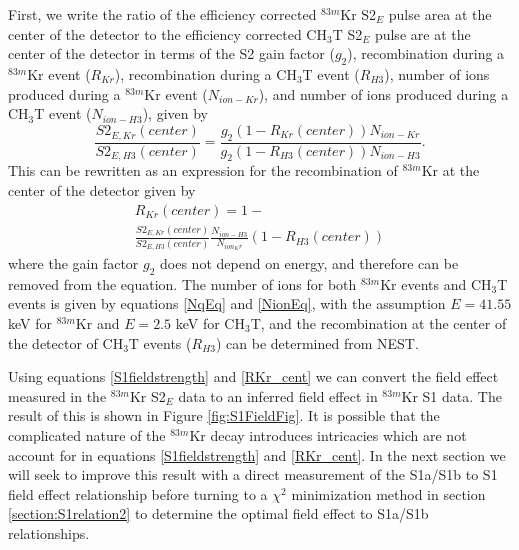 \documentclass[a4paper,10pt,twocolumn]{article}
\begin{document}
First, we write the ratio of the efficiency corrected $^{83m}$Kr  S2$_E$ pulse area at the center of the detector to the efficiency corrected CH$_3$T S2$_E$ pulse are at the center of the detector in terms of the S2 gain factor ($g_2$), recombination during a $^{83m}$Kr event ($R_{Kr}$), recombination during a CH$_3$T event ($R_{H3}$), number of ions produced during a $^{83m}$Kr event ($N_{ion-Kr}$), and number of ions produced during a CH$_3$T event ($N_{ion-H3}$), given by
\begin{equation}
\frac{S2_{E,Kr}(center)}{S2_{E,H3}(center)} = \frac{g_2(1-R_{Kr}(center))N_{ion-Kr}}{g_2(1-R_{H3}(center))N_{ion-H3}}.
\end{equation}
This can be rewritten as an expression for the recombination of $^{83m}$Kr at the center of the detector given by
\begin{multline} \label{RKr_cent}
R_{Kr}(center)=1- \\ \frac{S2_{E,Kr}(center)}{S2_{E,H3}(center)}\frac{N_{ion-H3}}{N_{ion_Kr}}(1-R_{H3}(center))
\end{multline}
where the gain factor $g_2$ does not depend on energy, and therefore can be removed from the equation.  The number of ions for both $^{83m}$Kr events and CH$_3$T events is given by equations \ref{NqEq} and \ref{NionEq}, with the assumption $E=41.55$ keV for $^{83m}$Kr and $E=2.5$ keV for CH$_3$T, and the recombination at the center of the detector of CH$_3$T events ($R_{H3}$) can be determined from NEST.

Using equations \ref{S1fieldstrength} and \ref{RKr_cent} we can convert the field effect measured in the $^{83m}$Kr S2$_E$ data to an inferred field effect in $^{83m}$Kr S1 data.
The result of this is shown in Figure \ref{fig:S1FieldFig}.  It is possible that the complicated nature of the  $^{83m}$Kr decay introduces intricacies which are not account for in equations \ref{S1fieldstrength} and \ref{RKr_cent}.  In the next section we will seek to improve this result with a direct measurement of the S1a/S1b to S1 field effect relationship before turning to a $\chi^2$ minimization method in section \ref{section:S1relation2} to determine the optimal field effect to S1a/S1b relationships.
\end{document}

